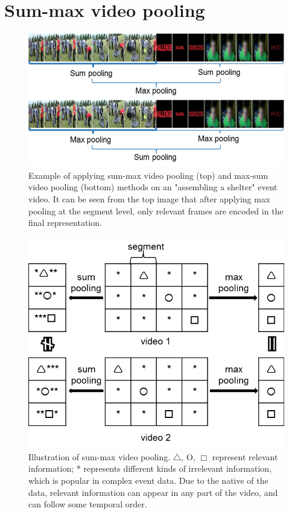 \section{Sum-max video pooling}
\label{sec:summax}
\begin{figure}
	\centering
	\includegraphics[width=1\textwidth]{summax_maxsum.png}
	\caption{Example of applying sum-max video pooling (top) and max-sum video pooling (bottom) methods on an "assembling a shelter" event video. It can be seen from the top image that after applying max pooling at the segment level, only relevant frames are encoded in the final representation.}
	\label{f_sum_max3}
\end{figure}
\begin{figure}[!htb]
	\centering
	\includegraphics[width=1\textwidth]{sum_max.png}
	\caption{Illustration of sum-max video pooling. $\triangle$, O, $\Box$ represent relevant information; * represents different kinds of irrelevant information, which is popular in complex event data. Due to the native of the data, relevant information can appear in any part of the video, and can follow some temporal order. }
	\label{f_sum_max}
\end{figure}
